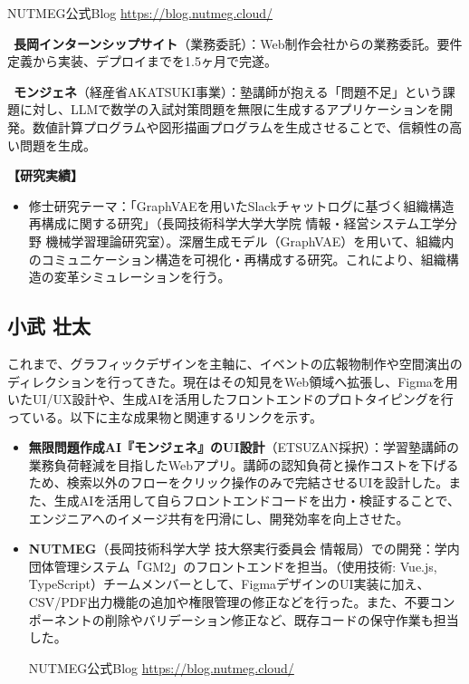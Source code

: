 \documentclass[paper=a4,fontsize=10.5bp,jafontsize=10.5bp,twocolumn]{jlreq}
\begin{document}
{\small\sffamily
\noindent
NUTMEG公式Blog \url{https://blog.nutmeg.cloud/}
}

\noindent\textbullet\ \textbf{長岡インターンシップサイト}（業務委託）：Web制作会社からの業務委託。要件定義から実装、デプロイまでを1.5ヶ月で完遂。

\noindent\textbullet\ \textbf{モンジェネ}（経産省AKATSUKI事業）：塾講師が抱える「問題不足」という課題に対し、LLMで数学の入試対策問題を無限に生成するアプリケーションを開発。数値計算プログラムや図形描画プログラムを生成させることで、信頼性の高い問題を生成。

\textbf{【研究実績】}
\begin{itemize}
  \item 修士研究テーマ：「GraphVAEを用いたSlackチャットログに基づく組織構造再構成に関する研究」（長岡技術科学大学大学院 情報・経営システム工学分野 機械学習理論研究室）。深層生成モデル（GraphVAE）を用いて、組織内のコミュニケーション構造を可視化・再構成する研究。これにより、組織構造の変革シミュレーションを行う。
\end{itemize}

\subsection*{小武 壮太}

これまで、グラフィックデザインを主軸に、イベントの広報物制作や空間演出のディレクションを行ってきた。現在はその知見をWeb領域へ拡張し、Figmaを用いたUI/UX設計や、生成AIを活用したフロントエンドのプロトタイピングを行っている。以下に主な成果物と関連するリンクを示す。

\begin{itemize}
  \item \textbf{無限問題作成AI『モンジェネ』のUI設計}（ETSUZAN採択）：学習塾講師の業務負荷軽減を目指したWebアプリ。講師の認知負荷と操作コストを下げるため、検索以外のフローをクリック操作のみで完結させるUIを設計した。また、生成AIを活用して自らフロントエンドコードを出力・検証することで、エンジニアへのイメージ共有を円滑にし、開発効率を向上させた。

  \item \textbf{NUTMEG}（長岡技術科学大学 技大祭実行委員会 情報局）での開発：学内団体管理システム「GM2」のフロントエンドを担当。（使用技術: Vue.js, TypeScript）チームメンバーとして、FigmaデザインのUI実装に加え、CSV/PDF出力機能の追加や権限管理の修正などを行った。また、不要コンポーネントの削除やバリデーション修正など、既存コードの保守作業も担当した。

  NUTMEG公式Blog \url{https://blog.nutmeg.cloud/}
\end{itemize}
\end{document}
